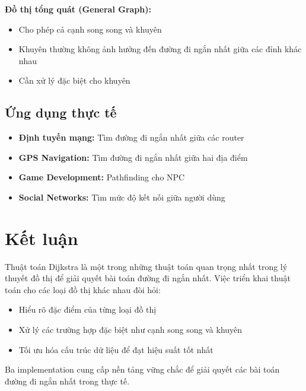 \documentclass[12pt,a4paper]{article}
\begin{document}
\textbf{Đồ thị tổng quát (General Graph):}
\begin{itemize}
\item Cho phép cả cạnh song song và khuyên
\item Khuyên thường không ảnh hưởng đến đường đi ngắn nhất giữa các đỉnh khác nhau
\item Cần xử lý đặc biệt cho khuyên
\end{itemize}

\subsection{Ứng dụng thực tế}

\begin{itemize}
\item \textbf{Định tuyến mạng:} Tìm đường đi ngắn nhất giữa các router
\item \textbf{GPS Navigation:} Tìm đường đi ngắn nhất giữa hai địa điểm
\item \textbf{Game Development:} Pathfinding cho NPC
\item \textbf{Social Networks:} Tìm mức độ kết nối giữa người dùng
\end{itemize}

\section{Kết luận}

Thuật toán Dijkstra là một trong những thuật toán quan trọng nhất trong lý thuyết đồ thị để giải quyết bài toán đường đi ngắn nhất. Việc triển khai thuật toán cho các loại đồ thị khác nhau đòi hỏi:

\begin{itemize}
\item Hiểu rõ đặc điểm của từng loại đồ thị
\item Xử lý các trường hợp đặc biệt như cạnh song song và khuyên
\item Tối ưu hóa cấu trúc dữ liệu để đạt hiệu suất tốt nhất
\end{itemize}

Ba implementation cung cấp nền tảng vững chắc để giải quyết các bài toán đường đi ngắn nhất trong thực tế.
\end{document}
